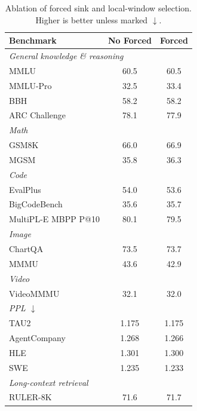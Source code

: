 \begin{table}[!htb]
\begin{minipage}[t]{0.48\textwidth}
\centering
\caption{Ablation of forced sink and local-window selection. Higher is better unless marked $\downarrow$.}
\label{tab:forced-sink-local}
\small
\begin{tabular}{l c c}
\toprule
Benchmark & No Forced & Forced \\
\midrule
\multicolumn{3}{l}{\textit{General knowledge \& reasoning}} \\
MMLU                                & 60.5 & 60.5 \\
MMLU-Pro                            & 32.5 & 33.4 \\
BBH                                 & 58.2 & 58.2 \\
ARC Challenge                       & 78.1 & 77.9 \\
\midrule
\multicolumn{3}{l}{\textit{Math}} \\
GSM8K                               & 66.0 & 66.9 \\
MGSM                                & 35.8 & 36.3 \\
\midrule
\multicolumn{3}{l}{\textit{Code}} \\
EvalPlus                            & 54.0 & 53.6 \\
BigCodeBench                        & 35.6 & 35.7 \\
MultiPL-E MBPP P@10                 & 80.1 & 79.5 \\
\midrule
\multicolumn{3}{l}{\textit{Image}} \\
ChartQA                            & 73.5 & 73.7 \\
MMMU                               & 43.6 & 42.9 \\
\midrule
\multicolumn{3}{l}{\textit{Video}} \\
VideoMMMU                          & 32.1 & 32.0 \\
\midrule
\multicolumn{3}{l}{\textit{PPL $\downarrow$}} \\
TAU2                                & 1.175 & 1.175 \\
AgentCompany                        & 1.268 & 1.266 \\
HLE                                 & 1.301 & 1.300 \\
SWE                                 & 1.235 & 1.233 \\
\midrule
\multicolumn{3}{l}{\textit{Long-context retrieval}} \\
RULER-8K                             & 71.6 & 71.7 \\

\end{tabular}
\end{minipage}
\end{table}

